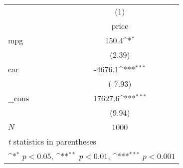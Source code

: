 {
\def\sym#1{\ifmmode^{#1}\else\(^{#1}\)\fi}
\begin{tabular}{l*{1}{c}}
\hline\hline
            &\multicolumn{1}{c}{(1)}\\
            &\multicolumn{1}{c}{price}\\
\hline
mpg         &       150.4\sym{*}  \\
            &      (2.39)         \\
[1em]
car         &     -4676.1\sym{***}\\
            &     (-7.93)         \\
[1em]
\_cons      &     17627.6\sym{***}\\
            &      (9.94)         \\
\hline
\(N\)       &        1000         \\
\hline\hline
\multicolumn{2}{l}{\footnotesize \textit{t} statistics in parentheses}\\
\multicolumn{2}{l}{\footnotesize \sym{*} \(p<0.05\), \sym{**} \(p<0.01\), \sym{***} \(p<0.001\)}\\
\end{tabular}
}

